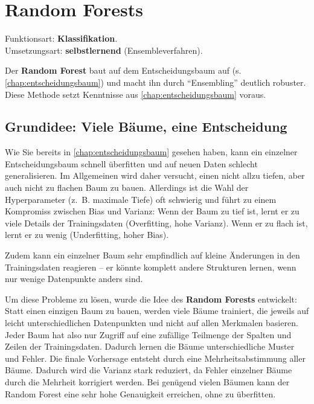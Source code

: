 \chapter{Random Forests}
\label{chap:randomforest}

\begin{myremark}
    Funktionsart: \textbf{Klassifikation}. \\
    Umsetzungsart: \textbf{selbstlernend} (Ensembleverfahren).
\end{myremark}

\begin{myremark}
    Der \textbf{Random Forest} baut auf dem Entscheidungsbaum auf (s. \cref{chap:entscheidungsbaum}) und macht ihn
    durch \enquote{Ensembling} deutlich robuster. Diese Methode setzt Kenntnisse aus \cref{chap:entscheidungsbaum} voraus.
\end{myremark}

\section{Grundidee: Viele Bäume, eine Entscheidung}

Wie Sie bereits in \cref{chap:entscheidungsbaum} gesehen haben, kann ein einzelner Entscheidungsbaum schnell überfitten und auf neuen Daten schlecht generalisieren. Im Allgemeinen wird daher versucht, einen nicht allzu tiefen, aber auch nicht zu flachen Baum zu bauen. Allerdings ist die Wahl der Hyperparameter (z.~B. maximale Tiefe) oft schwierig und führt zu einem Kompromiss zwischen Bias und Varianz: Wenn der Baum zu tief ist, lernt er zu viele Details der Trainingsdaten (Overfitting, hohe Varianz). Wenn er zu flach ist, lernt er zu wenig (Underfitting, hoher Bias).

Zudem kann ein einzelner Baum sehr empfindlich auf kleine Änderungen in den Trainingsdaten reagieren -- er könnte komplett andere Strukturen lernen, wenn nur wenige Datenpunkte anders sind.

Um diese Probleme zu lösen, wurde die Idee des \textbf{Random Forests} entwickelt: Statt einen einzigen Baum zu bauen, werden viele Bäume trainiert, die jeweils auf leicht unterschiedlichen Datenpunkten und nicht auf allen Merkmalen basieren. Jeder Baum hat also nur Zugriff auf eine zufällige Teilmenge der Spalten und Zeilen der Trainingsdaten. Dadurch lernen die Bäume unterschiedliche Muster und Fehler. Die finale Vorhersage entsteht durch eine Mehrheitsabstimmung aller Bäume. Dadurch wird die Varianz stark reduziert, da Fehler einzelner Bäume durch die Mehrheit korrigiert werden. Bei genügend vielen Bäumen kann der Random Forest eine sehr hohe Genauigkeit erreichen, ohne zu überfitten.

